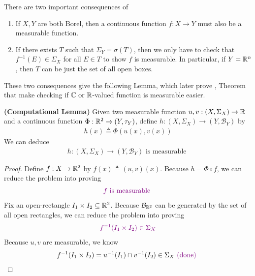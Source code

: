 \documentclass{report}
\begin{document}
\begin{mdframed}
There are two important consequences of 
\begin{enumerate}[label=(\alph*)]
  \item If $X,Y$ are both Borel, then a continuous function  $f:X\rightarrow Y$ must also be a measurable function. 
  \item If there exists $T$ such that  $\Sigma_Y=\sigma (T)$, then we only have to check that $f^{-1}(E)\in \Sigma_X$ for all $E \in T$ to show $f$ is measurable. In particular, if $Y=\mathbb{R}^n$, then  $T$ can be just the set of all open boxes.
\end{enumerate}
These two consequences give the following Lemma, which later prove , Theorem that make checking if $\mathbb{C}\text{ or }\mathbb{R}$-valued function is measurable easier.
\end{mdframed}
\begin{lemma}
\label{CL}
\textbf{(Computational Lemma)} Given two measurable function $u,v:(X,\Sigma_X)\rightarrow \mathbb{R}$ and a continuous function $\Phi:\mathbb{R}^2 \rightarrow (Y,\tau_Y)$, define $h:(X,\Sigma_X)\rightarrow (Y,\mathcal{B}_Y)$ by
\begin{align*}
h(x)\triangleq \Phi(u(x),v(x))
\end{align*}
We can deduce
\begin{align*}
h:(X,\Sigma_X)\rightarrow (Y,\mathcal{B}_Y)\text{ is measurable }
\end{align*}
\end{lemma}
\begin{proof}
Define $f:X\rightarrow \mathbb{R}^2$ by $f(x)\triangleq (u,v)(x)$. Because $h=\Phi \circ f$, we can reduce the problem into proving
\begin{align*}
\textcolor{violet}{f\text{ is measurable }}
\end{align*}
Fix an open-rectangle $I_1\times I_2 \subseteq \mathbb{R}^2$. Because $\mathcal{B}_{\mathbb{R}^2}$ can be generated by the set of all open rectangles, we can reduce the problem into proving 
\begin{align*}
  \textcolor{violet}{f^{-1}(I_1\times I_2) \in \Sigma_X}
\end{align*}
Because $u,v$ are measurable, we know
\begin{align*}
f^{-1}(I_1\times I_2)=u^{-1}(I_1)\cap v^{-1}(I_2) \in \Sigma_X \textcolor{violet}{\text{ (done) }}
\end{align*}
\end{proof}
\end{document}
